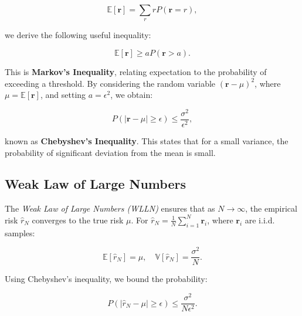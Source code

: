\[
    \mathbb{E}[\mathbf{r}] = \sum_r r P(\mathbf{r} = r),
\]

we derive the following useful inequality:

\[
    \mathbb{E}[\mathbf{r}] \geq a P(\mathbf{r} > a).
\]

This is \textbf{Markov's Inequality}, relating expectation to the probability of exceeding a threshold. By considering the random variable $(\mathbf{r} - \mu)^2$, where $\mu = \mathbb{E}[\mathbf{r}]$, and setting $a = \epsilon^2$, we obtain:

\[
    P(|\mathbf{r} - \mu| \geq \epsilon) \leq \frac{\sigma^2}{\epsilon^2},
\]

known as \textbf{Chebyshev's Inequality}. This states that for a small variance, the probability of significant deviation from the mean is small.

\subsection{Weak Law of Large Numbers}

The \textit{Weak Law of Large Numbers (WLLN)} ensures that as $N \to \infty$, the empirical risk $\hat{r}_N$ converges to the true risk $\mu$. For $\hat{r}_N = \frac{1}{N} \sum_{i=1}^N \mathbf{r}_i$, where $\mathbf{r}_i$ are i.i.d. samples:

\[
    \mathbb{E}[\hat{r}_N] = \mu, \quad \mathbb{V}[\hat{r}_N] = \frac{\sigma^2}{N}.
\]

Using Chebyshev’s inequality, we bound the probability:

\[
    P(|\hat{r}_N - \mu| \geq \epsilon) \leq \frac{\sigma^2}{N \epsilon^2}.
\]



